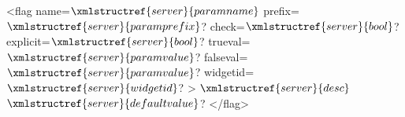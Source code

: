 <flag name=$\xmlstructref{server}{paramname}$ prefix=$\xmlstructref{server}{paramprefix}$? check=$\xmlstructref{server}{bool}$? 
     explicit=$\xmlstructref{server}{bool}$?  trueval=$\xmlstructref{server}{paramvalue}$? falseval=$\xmlstructref{server}{paramvalue}$?
     widgetid=$\xmlstructref{server}{widgetid}$? >
  $\xmlstructref{server}{desc}$
  $\xmlstructref{server}{defaultvalue}$?
</flag>
